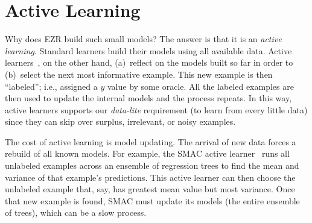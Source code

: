 \documentclass[AMA,STIX2COL]{WileyNJDv5}
\begin{document}

\section{Active Learning}
 Why does EZR build such small models? The answer is that it is an {\em active learning}.
 Standard learners build their models using all available data.
 Active learners~\cite{settles2009active,van2020survey}, on the other hand,  (a)~reflect on the models built so far in order to (b)~select the next
 most informative example. This new example is then ``labeled''; i.e., assigned a $y$ value by some oracle. All the labeled examples are then used to
 update the internal models and the
 process repeats. In this way, active learners supports our {\em data-lite}
 requirement (to learn from every little data)  since they
 can skip over surplus,
 irrelevant, or noisy examples.

The cost of active learning is model updating.  The arrival of  new data forces a   rebuild
of all known models.
 For example, the SMAC active learner~\cite{hutter2011sequential} runs all
 unlabeled examples across an  ensemble of regression trees to find the mean and variance
 of that example's predictions. This active learner can then choose the unlabeled
 example that, say, has greatest mean value but most variance. 
 Once that new example is found, SMAC must update its models (the entire ensemble of trees), which can be a slow process.
\end{document}
